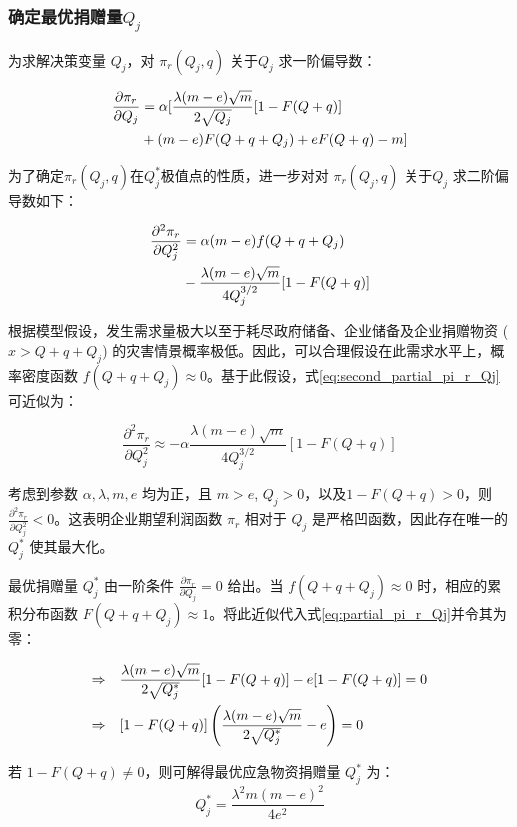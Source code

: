 \documentclass[a4paper,8pt,twocolumn]{article} %
\begin{document}
\subsubsection{确定最优捐赠量$Q_j$}
为求解决策变量 $Q_j$，对 $\pi_r(Q_j,q)$ 关于$Q_j$ 求一阶偏导数：
\begin{small}\label{eq:partial_pi_r_Qj}
\begin{align}
\frac{\partial{\pi}_r}{\partial Q_j} &= \alpha[ \frac{\lambda(m-e)\sqrt{m}}{2\sqrt{Q_j}} [1 - F(Q+q)]\notag \\
&+ (m-e) F(Q+q+Q_j) + e F(Q+q) - m ]
\end{align}
\end{small}
为了确定$\pi_r(Q_j,q)$在$Q_j^*$极值点的性质，进一步对对 $\pi_r(Q_j,q)$ 关于$Q_j$ 求二阶偏导数如下：
\begin{small}\label{eq:second_partial_pi_r_Qj}
    \begin{align}
        \frac{\partial^2 {\pi}_r}{\partial Q_j^2} &= \alpha  (m-e) f(Q+q+Q_j) \notag \\
        &- \frac{\lambda(m-e)\sqrt{m}}{4 Q_j^{3/2}} [1 - F(Q+q)]
    \end{align}
\end{small}
根据模型假设，发生需求量极大以至于耗尽政府储备、企业储备及企业捐赠物资 ($x > Q+q+Q_j$) 的灾害情景概率极低。因此，可以合理假设在此需求水平上，概率密度函数 $f(Q+q+Q_j) \approx 0$。基于此假设，式\eqref{eq:second_partial_pi_r_Qj} 可近似为：
\begin{small}
    \begin{equation}
\frac{\partial^2 {\pi}_r}{\partial Q_j^2} \approx - \alpha \frac{\lambda(m-e)\sqrt{m}}{4 Q_j^{3/2}} [1 - F(Q+q)]
\end{equation}
\end{small}

考虑到参数 $\alpha, \lambda, m, e$ 均为正，且 $m>e$, $Q_j > 0$，以及$1-F(Q+q) > 0$，则 $\frac{\partial^2 {\pi}_r}{\partial Q_j^2} < 0$。这表明企业期望利润函数 $\pi_r$ 相对于 $Q_j$ 是严格凹函数，因此存在唯一的 $Q_j^*$ 使其最大化。

最优捐赠量 $Q_j^*$ 由一阶条件 $\frac{\partial{\pi}_r}{\partial Q_j}=0$ 给出。当 $f(Q+q+Q_j) \approx 0$ 时，相应的累积分布函数 $F(Q+q+Q_j) \approx 1$。将此近似代入式\eqref{eq:partial_pi_r_Qj}并令其为零：
\begin{small}\begin{align}
\Rightarrow \quad & \frac{\lambda(m-e)\sqrt{m}}{2\sqrt{Q_j^*}} [1 - F(Q+q)] - e [1 - F(Q+q)] = 0 \notag \\
\Rightarrow \quad & [1 - F(Q+q)] \left( \frac{\lambda(m-e)\sqrt{m}}{2\sqrt{Q_j^*}} - e \right) = 0
\end{align}
\end{small}
若 $1 - F(Q+q) \neq 0$，则可解得最优应急物资捐赠量 $Q_j^*$ 为：
\begin{equation}
Q_j^* = \frac{\lambda^2 m (m-e)^2}{4e^2}
\label{eq:optimal_Qj}
\end{equation}
\end{document}
